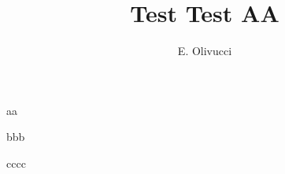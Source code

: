 \documentclass[a4paper]{article}
\author{E. Olivucci}
\title{Test Test AA}
\begin{document}
\maketitle

aa

bbb

cccc
\end{document}
